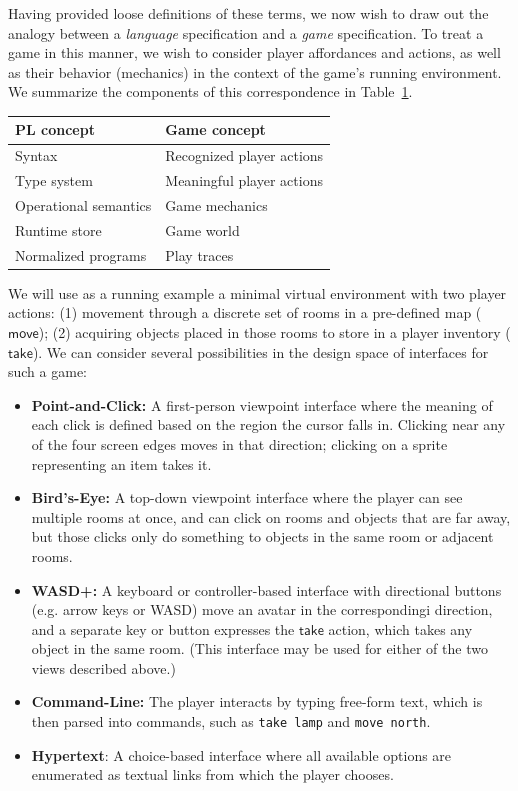   Having provided loose definitions of these terms, we now wish to draw out
  the analogy between a {\em language} specification and a {\em game}
  specification. To treat a game in this manner, we wish to consider player
  affordances and actions, as well as their behavior (mechanics) in the
  context of the game's running environment. We summarize the components of
  this correspondence in Table~\ref{tab:correspondence}.

  \begin{table}
  \begin{tabular}{ll}
    PL concept & Game concept\\
    \hline
    Syntax & Recognized player actions \\
    Type system & Meaningful player actions \\
    Operational semantics & Game mechanics \\
    Runtime store & Game world \\
    Normalized programs & Play traces 
  \end{tabular}
  \label{tab:correspondence}
  \end{table}

  \newcommand{\cmove}{\mathsf{move}}
  \newcommand{\ctake}{\mathsf{take}}

  We will use as a running example a minimal virtual environment with two
  player actions: (1) movement through a discrete set of rooms in a
  pre-defined map ($\cmove$); (2) acquiring objects placed in those rooms to store in
  a player inventory ($\ctake$).  We can consider several possibilities in
  the design space of interfaces for such a game:

  \begin{itemize}
   \item {\bf Point-and-Click:} A first-person viewpoint interface where the
     meaning of each click is defined based on the region the cursor falls
     in. Clicking near any of the four screen edges moves in that
     direction; clicking on a sprite representing an item takes it.
  \item {\bf Bird's-Eye:} A top-down viewpoint interface where the player can see multiple
    rooms at once, and can click on rooms and objects that are far away,
    but those clicks only do something to objects in the same room or
    adjacent rooms.
  \item {\bf WASD+:} A keyboard or controller-based interface with
    directional buttons (e.g. arrow keys or WASD) move an avatar in the
    correspondingi direction, and a separate key or button expresses
    the $\ctake$ action, which takes any object in the same room. (This
    interface may be used for either of the two views described above.)
  \item{\bf Command-Line:} The player interacts by typing free-form text, 
    which is then parsed into commands, such as \verb|take lamp| and \verb|move north|.
  \item{\bf Hypertext}: A choice-based interface where all available options are
    enumerated as textual links from which the player chooses.
  \end{itemize}

